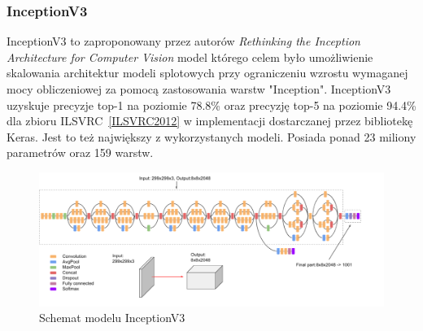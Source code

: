 \documentclass[
    left=2.5cm,         %
    right=2.5cm,        %
    top=2.5cm,          %
    bottom=3cm,         %
    bindingoffset=6mm,  %
    nohyphenation=false %
]{eiti/eiti-thesis}
\begin{document}
        \subsubsection{InceptionV3}\label{InceptionV3}
            InceptionV3 to zaproponowany przez autorów
            \textit{Rethinking the Inception Architecture for Computer Vision}\cite{DBLP:journals/corr/SzegedyVISW15}
            model którego celem było umożliwienie skalowania architektur modeli splotowych przy ograniczeniu wzrostu
            wymaganej mocy obliczeniowej za pomocą zastosowania warstw "Inception".
            InceptionV3 uzyskuje precyzje top-1 na poziomie 78.8\% oraz precyzję top-5 na
            poziomie 94.4\% dla zbioru ILSVRC~\ref{ILSVRC2012} w implementacji dostarczanej przez bibliotekę Keras.
            Jest to też największy z wykorzystanych modeli. Posiada ponad 23 miliony parametrów oraz 159 warstw.
            \begin{figure}[H]
            \centring
            \includegraphics[width=\textwidth]{eiti/inceptionv3overview.png}
            \caption{Schemat modelu InceptionV3}
            \end{figure}

\end{document}
